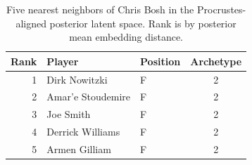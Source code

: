 \begin{table}[htbp]
  \centering\small
  \begin{tabular}{rllc}
    \toprule
    Rank & Player & Position & Archetype \\
    \midrule
    1 & Dirk Nowitzki & F & 2 \\
    2 & Amar'e Stoudemire & F & 2 \\
    3 & Joe Smith & F & 2 \\
    4 & Derrick Williams & F & 2 \\
    5 & Armen Gilliam & F & 2 \\
    \bottomrule
  \end{tabular}
  \caption{Five nearest neighbors of Chris Bosh in the Procrustes-aligned posterior latent space. Rank is by posterior mean embedding distance.}
  \label{tab:Chris_Bosh_neighbors}
\end{table}

